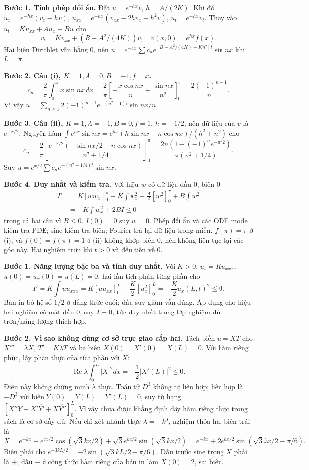 \textbf{Bước 1. Tính phép đổi ẩn.}
Đặt $u=e^{-hx}v$, $h=A/(2K)$. Khi đó $u_x=e^{-hx}(v_x-hv)$, $u_{xx}=e^{-hx}(v_{xx}-2hv_x+h^2v)$, $u_t=e^{-hx}v_t$. Thay vào $u_t=Ku_{xx}+Au_x+Bu$ cho
\[v_t=Kv_{xx}+(B-A^2/(4K))v,\quad v(x,0)=e^{hx}f(x).\]
Hai biên Dirichlet vẫn bằng $0$, nên $u=e^{-hx}\sum c_ne^{[B-A^2/(4K)-Kn^2]t}\sin nx$ khi $L=\pi$.

\textbf{Bước 2. Câu (i), $K=1,A=0,B=-1,f=x$.}
\[c_n=\frac2\pi\int_0^\pi x\sin nx\,dx
=\frac2\pi\left[-\frac{x\cos nx}n+\frac{\sin nx}{n^2}\right]_0^\pi
=\frac{2(-1)^{n+1}}n.\]
Vì vậy $u=\sum_{n\ge1}2(-1)^{n+1}e^{-(n^2+1)t}\sin nx/n$.

\textbf{Bước 3. Câu (ii), $K=1,A=-1,B=0,f=1$.}
$h=-1/2$, nên dữ liệu của $v$ là $e^{-x/2}$. Nguyên hàm $\int e^{hx}\sin nx=e^{hx}(h\sin nx-n\cos nx)/(h^2+n^2)$ cho
\[c_n=\frac2\pi\left[\frac{e^{-x/2}(-\sin nx/2-n\cos nx)}{n^2+1/4}\right]_0^\pi
=\frac{2n(1-(-1)^ne^{-\pi/2})}{\pi(n^2+1/4)}.\]
Suy $u=e^{x/2}\sum c_ne^{-(n^2+1/4)t}\sin nx$.

\textbf{Bước 4. Duy nhất và kiểm tra.}
Với hiệu $w$ có dữ liệu đầu $0$, biên $0$,
\begin{align*}
I'&=K[ww_x]_0^\pi-K\int w_x^2+\frac A2[w^2]_0^\pi+B\int w^2\\
&=-K\int w_x^2+2BI\le0
\end{align*}
trong cả hai câu vì $B\le0$. $I(0)=0$ suy $w=0$. Phép đổi ẩn và các ODE mode kiểm tra PDE; sine kiểm tra biên; Fourier trả lại dữ liệu trong miền. $f(\pi)=\pi$ ở (i), và $f(0)=f(\pi)=1$ ở (ii) không khớp biên $0$, nên không liên tục tại các góc này. Hai nghiệm trơn khi $t>0$ và đều tiến về $0$.

\textbf{Bước 1. Năng lượng bậc ba và tính duy nhất.}
Với $K>0$, $u_t=Ku_{xxx}$, $u(0)=u_x(0)=u(L)=0$, hai lần tích phân từng phần cho
\[I'=K\int uu_{xxx}
=K[uu_{xx}]_0^L-\frac K2[u_x^2]_0^L
=-\frac K2u_x(L,t)^2\le0.\]
Bản in bỏ hệ số $1/2$ ở đẳng thức cuối; dấu suy giảm vẫn đúng. Áp dụng cho hiệu hai nghiệm có mặt đầu $0$, suy $I=0$, tức duy nhất trong lớp nghiệm đủ trơn/năng lượng thích hợp.

\textbf{Bước 2. Vì sao không dùng cơ sở trực giao cấp hai.}
Tách biến $u=XT$ cho $X'''=\lambda X$, $T'=K\lambda T$ và ba biên $X(0)=X'(0)=X(L)=0$. Với hàm riêng phức, lấy phần thực của tích phân với $\overline X$:
\[\operatorname{Re}\lambda\int_0^L|X|^2dx=-\frac12|X'(L)|^2\le0.\]
Điều này không chứng minh $\lambda$ thực. Toán tử $D^3$ không tự liên hợp; liên hợp là $-D^3$ với biên $Y(0)=Y(L)=Y'(L)=0$, suy từ hạng $[X''\overline Y-X'\overline{Y'}+X\overline{Y''}]_0^L$. Vì vậy chưa được khẳng định dãy hàm riêng thực trong sách là cơ sở đầy đủ.
Nếu chỉ xét nhánh thực $\lambda=-k^3$, nghiệm thỏa hai biên trái là
\[X=e^{-kx}-e^{kx/2}\cos(\sqrt3kx/2)+\sqrt3e^{kx/2}\sin(\sqrt3kx/2)
=e^{-kx}+2e^{kx/2}\sin(\sqrt3kx/2-\pi/6).\]
Biên phải cho $e^{-3kL/2}=-2\sin(\sqrt3kL/2-\pi/6)$. Dấu trước sine trong $X$ phải là $+$; dấu $-$ ở công thức hàm riêng của bản in làm $X(0)=2$, sai biên.

